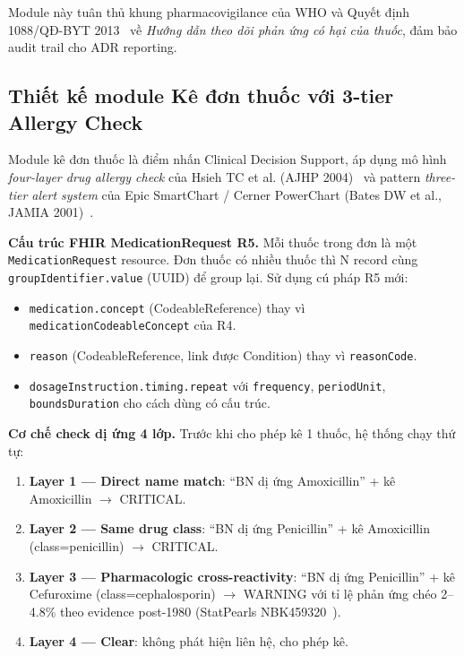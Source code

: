 \documentclass[a4paper,13pt,3p,oneside]{report}
\theoremstyle{definition}
\theoremstyle{remark}
\theoremstyle{definition}
\begin{document}
Module này tuân thủ khung pharmacovigilance của WHO và Quyết định 1088/QĐ-BYT 2013~\cite{qd1088} về \textit{Hướng dẫn theo dõi phản ứng có hại của thuốc}, đảm bảo audit trail cho ADR reporting.

\subsection{Thiết kế module Kê đơn thuốc với 3-tier Allergy Check}

Module kê đơn thuốc là điểm nhấn Clinical Decision Support, áp dụng mô hình \textit{four-layer drug allergy check} của Hsieh TC et al. (AJHP 2004)~\cite{hsieh2004} và pattern \textit{three-tier alert system} của Epic SmartChart / Cerner PowerChart (Bates DW et al., JAMIA 2001)~\cite{bates2001}.

\textbf{Cấu trúc FHIR MedicationRequest R5.} Mỗi thuốc trong đơn là một \texttt{MedicationRequest} resource. Đơn thuốc có nhiều thuốc thì N record cùng \texttt{groupIdentifier.value} (UUID) để group lại. Sử dụng cú pháp R5 mới:
\begin{itemize}
  \item \texttt{medication.concept} (CodeableReference) thay vì \texttt{medicationCodeableConcept} của R4.
  \item \texttt{reason} (CodeableReference, link được Condition) thay vì \texttt{reasonCode}.
  \item \texttt{dosageInstruction.timing.repeat} với \texttt{frequency}, \texttt{periodUnit}, \texttt{boundsDuration} cho cách dùng có cấu trúc.
\end{itemize}

\textbf{Cơ chế check dị ứng 4 lớp.} Trước khi cho phép kê 1 thuốc, hệ thống chạy thứ tự:
\begin{enumerate}
  \item \textbf{Layer 1 --- Direct name match}: ``BN dị ứng Amoxicillin'' + kê Amoxicillin $\to$ CRITICAL.
  \item \textbf{Layer 2 --- Same drug class}: ``BN dị ứng Penicillin'' + kê Amoxicillin (class=penicillin) $\to$ CRITICAL.
  \item \textbf{Layer 3 --- Pharmacologic cross-reactivity}: ``BN dị ứng Penicillin'' + kê Cefuroxime (class=cephalosporin) $\to$ WARNING với tỉ lệ phản ứng chéo 2--4.8\% theo evidence post-1980 (StatPearls NBK459320~\cite{statpearls}).
  \item \textbf{Layer 4 --- Clear}: không phát hiện liên hệ, cho phép kê.
\end{enumerate}
\end{document}
